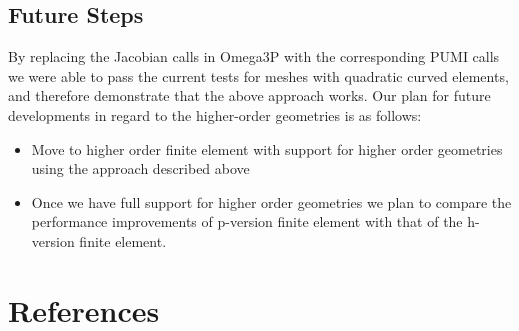 \documentclass[review,12pt]{elsarticle_summary_report}
\begin{document}
\subsection{\label{high_order_geom_future} Future Steps}
By replacing the Jacobian calls in Omega3P with the corresponding PUMI calls we were able to pass the current tests for meshes with quadratic curved  elements, and therefore demonstrate that the above approach works. Our plan for future developments in regard to the higher-order geometries is as follows:

\begin{itemize}
  \item Move to higher order finite element with support for higher order geometries using the approach described above
  \item Once we have full support for higher order geometries we plan to compare the performance improvements of p-version finite element with that of the h-version finite element. 
\end{itemize}

\section*{References}
% 


\end{document}
